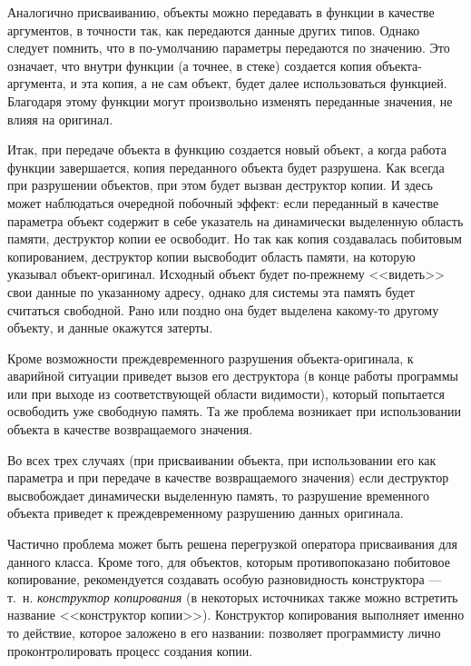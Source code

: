 Аналогично присваиванию, объекты можно передавать в функции в качестве аргументов, в точности так, как передаются данные
других типов. Однако следует помнить, что в  по-умолчанию параметры передаются по значению. Это означает, что внутри
функции (а точнее, в стеке) создается копия объекта-аргумента, и эта копия, а не сам объект, будет далее использоваться
функцией. Благодаря этому функции могут произвольно изменять переданные значения, не влияя на оригинал. 

Итак, при передаче объекта в функцию создается новый объект, а когда работа функции завершается, копия переданного
объекта будет разрушена. Как всегда при разрушении объектов, при этом будет вызван деструктор копии. И здесь может
наблюдаться очередной побочный эффект: если переданный в качестве параметра объект содержит в себе указатель на
динамически выделенную область памяти, деструктор копии ее освободит. Но так как копия создавалась побитовым
копированием, деструктор копии высвободит область памяти, на которую указывал объект-оригинал. Исходный объект будет
по-прежнему <<видеть>> свои данные по указанному адресу, однако для системы эта память будет считаться свободной. Рано
или поздно она будет выделена какому-то другому объекту, и данные окажутся затерты. 

Кроме возможности преждевременного разрушения объекта-оригинала, к аварийной ситуации приведет вызов его деструктора (в
конце работы программы или при выходе из соответствующей области видимости), который попытается освободить уже
свободную память. Та же проблема возникает при использовании объекта в качестве возвращаемого значения.

Во всех трех случаях (при присваивании объекта, при использовании его как параметра и при передаче в качестве
возвращаемого значения) если деструктор высвобождает динамически выделенную память, то разрушение временного объекта
приведет к преждевременному разрушению данных оригинала.

Частично проблема может быть решена перегрузкой оператора присваивания для  данного класса. Кроме того, для объектов,
которым противопоказано побитовое копирование, рекомендуется создавать особую разновидность конструктора --- т.~н. 
\emph{конструктор копирования} (в
некоторых источниках также можно встретить название <<конструктор копии>>). Конструктор копирования выполняет именно то
действие, которое заложено в его названии: позволяет программисту лично проконтролировать процесс создания копии.

